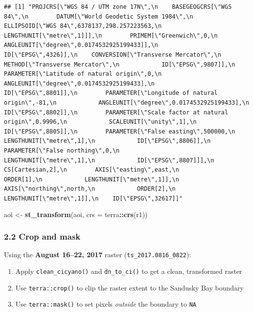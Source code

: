\documentclass[
]{article}
\newenvironment{Shaded}{\begin{snugshade}}{\end{snugshade}}
\newcommand{\AttributeTok}[1]{\textcolor[rgb]{0.13,0.29,0.53}{#1}}
\newcommand{\FunctionTok}[1]{\textcolor[rgb]{0.13,0.29,0.53}{\textbf{#1}}}
\newcommand{\NormalTok}[1]{#1}
\newcommand{\OtherTok}[1]{\textcolor[rgb]{0.56,0.35,0.01}{#1}}
\newcommand{\SpecialCharTok}[1]{\textcolor[rgb]{0.81,0.36,0.00}{\textbf{#1}}}
\providecommand{\tightlist}{%
  \setlength{\itemsep}{0pt}\setlength{\parskip}{0pt}}
\begin{document}
\begin{verbatim}
## [1] "PROJCRS[\"WGS 84 / UTM zone 17N\",\n    BASEGEOGCRS[\"WGS 84\",\n        DATUM[\"World Geodetic System 1984\",\n            ELLIPSOID[\"WGS 84\",6378137,298.257223563,\n                LENGTHUNIT[\"metre\",1]]],\n        PRIMEM[\"Greenwich\",0,\n            ANGLEUNIT[\"degree\",0.0174532925199433]],\n        ID[\"EPSG\",4326]],\n    CONVERSION[\"Transverse Mercator\",\n        METHOD[\"Transverse Mercator\",\n            ID[\"EPSG\",9807]],\n        PARAMETER[\"Latitude of natural origin\",0,\n            ANGLEUNIT[\"degree\",0.0174532925199433],\n            ID[\"EPSG\",8801]],\n        PARAMETER[\"Longitude of natural origin\",-81,\n            ANGLEUNIT[\"degree\",0.0174532925199433],\n            ID[\"EPSG\",8802]],\n        PARAMETER[\"Scale factor at natural origin\",0.9996,\n            SCALEUNIT[\"unity\",1],\n            ID[\"EPSG\",8805]],\n        PARAMETER[\"False easting\",500000,\n            LENGTHUNIT[\"metre\",1],\n            ID[\"EPSG\",8806]],\n        PARAMETER[\"False northing\",0,\n            LENGTHUNIT[\"metre\",1],\n            ID[\"EPSG\",8807]]],\n    CS[Cartesian,2],\n        AXIS[\"easting\",east,\n            ORDER[1],\n            LENGTHUNIT[\"metre\",1]],\n        AXIS[\"northing\",north,\n            ORDER[2],\n            LENGTHUNIT[\"metre\",1]],\n    ID[\"EPSG\",32617]]"
\end{verbatim}

\begin{Shaded}
\begin{Highlighting}[]
\NormalTok{aoi }\OtherTok{\textless{}{-}} \FunctionTok{st\_transform}\NormalTok{(aoi, }\AttributeTok{crs =}\NormalTok{ terra}\SpecialCharTok{::}\FunctionTok{crs}\NormalTok{(r1))}
\end{Highlighting}
\end{Shaded}

\hypertarget{crop-and-mask}{%
\subsubsection{2.2 Crop and mask}\label{crop-and-mask}}

Using the \textbf{August 16--22, 2017} raster
(\texttt{ts\_2017.0816\_0822}):

\begin{enumerate}
\def\labelenumi{\arabic{enumi}.}
\tightlist
\item
  Apply \texttt{clean\_cicyano()} and \texttt{dn\_to\_ci()} to get a
  clean, transformed raster
\item
  Use \texttt{terra::crop()} to clip the raster extent to the Sandusky
  Bay boundary
\item
  Use \texttt{terra::mask()} to set pixels \emph{outside} the boundary
  to \texttt{NA}
\end{enumerate}
\end{document}
